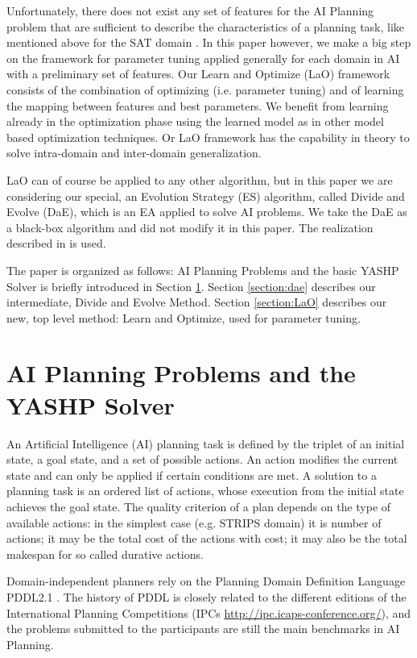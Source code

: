 \documentclass{article}
\begin{document}
Unfortunately, there does not exist any set of features for the AI Planning problem that are sufficient to describe the characteristics of a planning task, like mentioned above for the SAT domain \cite{Hutter06}. In this paper however, we make a big step on the framework for parameter tuning applied generally for each domain in AI with a preliminary set of features. Our Learn and Optimize (LaO) framework consists of the combination of optimizing (i.e. parameter tuning) and of learning the mapping between features and best parameters. We benefit from learning already in the optimization phase using the learned model as in other model based optimization techniques. Or LaO framework has the capability in theory to solve intra-domain and inter-domain generalization.

LaO can of course be applied to any other algorithm, but in this paper we are considering our special, an Evolution Strategy (ES) algorithm, called Divide and Evolve (DaE), which is an EA applied to solve AI problems. We take the DaE as a black-box algorithm and did not modify it in this paper. The realization described in \cite{BibEvoCop:2010} is used. 

The paper is organized as follows: AI Planning Problems and the basic YASHP Solver is briefly introduced in Section \ref{section:planning}. Section \ref{section:dae} describes our intermediate, Divide and Evolve Method. Section \ref{section:LaO} describes our new, top level method: Learn and Optimize, used for parameter tuning. 

\section{AI Planning Problems and the YASHP Solver}
\label{section:planning}

An Artificial Intelligence (AI) planning task is defined by the triplet of an initial state, a goal state, and a set of possible actions. An action modifies the current state and can only be applied if certain conditions are met. A solution to a planning task is an ordered list of actions, whose execution from the initial state achieves the goal state. The quality criterion of a plan depends on the type of available actions: in the simplest case (e.g. STRIPS domain) it is number of actions; it may be the total cost of the actions with cost; it may also be the total makespan for so called durative actions.

Domain-independent planners rely on the Planning Domain Definition Language PDDL2.1 \cite{Fox-JAIR-2003}. The history of PDDL is closely related to the different editions of the International Planning Competitions (IPCs \url{http://ipc.icaps-conference.org/}), and the problems submitted to the participants are still the main benchmarks in AI Planning.
\end{document}

